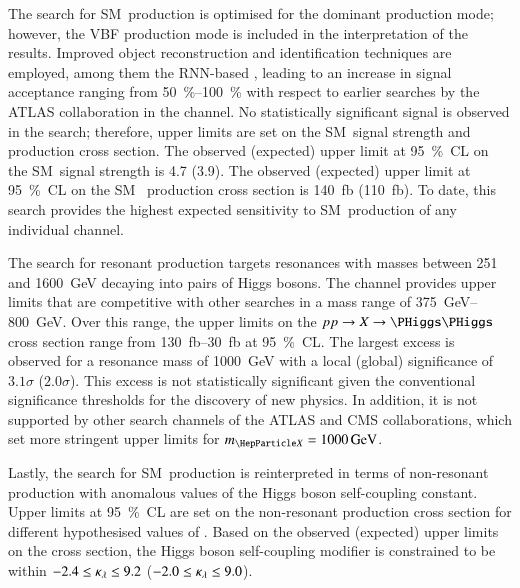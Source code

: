 The search for SM~\HH production is optimised for the dominant \ggF production
mode; however, the VBF production mode is included in the interpretation of the
results. Improved object reconstruction and identification techniques are
employed, among them the RNN-based \tauid, leading to an increase in signal
acceptance ranging from \SIrange{50}{100}{\percent} with respect to earlier
searches by the ATLAS collaboration in the \bbtautau channel. No statistically
significant signal is observed in the search; therefore, upper limits are set on
the SM~\HH signal strength and production cross section. The observed (expected)
upper limit at \SI{95}{\percent}~CL on the SM~\HH signal strength is 4.7 (3.9).
The observed (expected) upper limit at \SI{95}{\percent}~CL on the SM~\HH
production cross section is \SI{140}{\femto\barn} (\SI{110}{\femto\barn}). To
date, this search provides the highest expected sensitivity to SM~\HH production
of any individual channel.


The search for resonant \HH production targets resonances with masses between
\num{251} and \SI{1600}{\GeV} decaying into pairs of Higgs bosons. The \bbtautau
channel provides upper limits that are competitive with other searches in a mass
range of \SIrange{375}{800}{\GeV}. Over this range, the upper limits on the
$pp \to X \to \HH$ cross section range from \SIrange{130}{30}{\femto\barn} at
\SI{95}{\percent}~CL. The largest excess is observed for a resonance mass of
\SI{1000}{\GeV} with a local (global) significance of $3.1\sigma$
($2.0\sigma$). This excess is not statistically significant given the
conventional significance thresholds for the discovery of new physics. In
addition, it is not supported by other search channels of the ATLAS and CMS
collaborations, which set more stringent upper limits for
$\mX = \SI{1000}{\GeV}$.


Lastly, the search for SM~\HH production is reinterpreted in terms of
non-resonant \HH production with anomalous values of the Higgs boson
self-coupling constant. Upper limits at \SI{95}{\percent}~CL are set on the
non-resonant \HH production cross section for different hypothesised values of
\klambda. Based on the observed (expected) upper limits on the cross section,
the Higgs boson self-coupling modifier is constrained to be within
$-2.4 \leq \kappa_{\lambda} \leq 9.2$ ($-2.0 \leq \kappa_{\lambda} \leq 9.0$).


